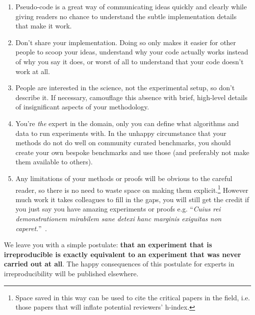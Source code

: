 \documentclass[a4paper,11pt]{article}
\begin{document}
\begin{enumerate}
\item Pseudo-code is a great way of communicating ideas quickly and clearly while giving readers no chance to understand the subtle implementation details that make it work. 
\item Don't share your implementation. Doing so only makes it easier for other people
to scoop your ideas, understand why your code actually works instead of why you say it does, or worst of all to 
understand that your code doesn't work at all. 
\item People are interested in the science, not the experimental setup, so don't
describe it.  If necessary, camouflage this absence with brief, high-level details of insignificant aspects of your methodology.
\item You're \emph{the} expert in the domain, only you can define what
algorithms and data to run experiments with. In the unhappy
circumstance that your methods do not do well on community curated benchmarks, you should
create your own bespoke benchmarks and use those (and preferably not make them available to others).
\item Any limitations of your methods or proofs will be obvious to the
careful reader, so there is no need to waste space on making them
explicit.\footnote{Space saved in this way can be used to cite the
  critical papers in the field, i.e. those papers that will inflate
  potential reviewers' h-index.}  However much work it takes
colleagues to fill in the gaps, you will still get the credit if you
just say you have amazing experiments or proofs e.g. ``{\emph{Cuius rei
    demonstrationem mirabilem sane detexi hanc marginis exiguitas non
    caperet.}}''~\cite{fermat:1637}.
\end{enumerate}

We leave you with a simple postulate: {\textbf{that an experiment that
is irreproducible is exactly equivalent to an experiment that was
never carried out at all}}. The happy consequences of this postulate
for experts in irreproducibility will be published elsewhere.

\end{document}
